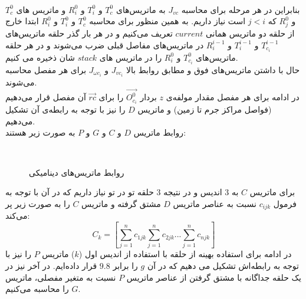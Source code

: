 \documentclass{article}
\begin{document}
\\
بنابراین در هر مرحله برای محاسبه $J_{vc}$ به ماتریس‌های $T_c^0$ و $T_i^0$ و $R_i^0$ و ماتریس های  $T_c^0$ و $R_j^0$ که $j<i$ است نیاز داریم. به همین منظور برای محاسبه  $T_c^0$ و $T_i^0$ و  $R_i^0$ ابتدا خارج از حلقه دو ماتریس همانی $current$ تعریف می‌کنیم و در هر بار گذر حلقه ماتریس‌های  $T_{c_i}^{i-1}$ و $T_{i}^{i-1}$ و $R_{i}^{i-1}$ در ماتریس‌های مفاصل قبلی ضرب می‌شوند و در هر حلقه ماتریس‌های $T_{c_i}^0$ و $R_i^0$ را در ماتریس های $stack$ شان ذخیره می کنیم.
\\
حال با داشتن ماتریس‌های فوق و مطابق روابط بالا $J_{vc_i}$ و $J_{\omega c_i}$ برای هر مفصل محاسبه می‌شوند.
\\
در ادامه برای هر مفصل مقدار مولفه‌ی $z$ بردار $\overrightarrow{O_{c_i}^0}$ را برای $\overrightarrow{rc}$ آن مفصل قرار می‌دهیم (فواصل مراکز جرم تا زمین) و ماتریس $D$ را نیز با توجه به رابطه‌ی آن تشکیل می‌دهیم.
\\
روابط ماتریس $D$ و $C$ و $G$ و $P$ به صورت زیر هستند:
\begin{figure}[H]%
    \centering
    \qquad
    \qquad
    \\
    \caption{روابط ماتریس‌های دینامیکی\label{fig:formula5}}
\end{figure}
\noindent
برای ماتریس $C$ به 3 اندیس و در نتیجه 3 حلقه تو در تو نیاز داریم که در آن با توجه به فرمول $c_{ijk}$ نسبت به عناصر ماتریس $D$ مشتق گرفته و ماتریس $C$ را به صورت زیر پر می‌کند:
\begin{equation}
C_k = [\sum_{j=1}^{n} c_{1jk} \sum_{j=1}^{n} c_{2jk} ... \sum_{j=1}^{n} c_{njk}]
\end{equation}
در ادامه برای استفاده بهینه از حلقه با استفاده از اندیس اول ($k$) ماتریس $P$ را نیز با توجه به رابطه‌اش تشکیل می دهیم که در آن $g$ را برابر $9.8$ قرار داده‌ایم.
در آخر نیز در یک حلقه جداگانه با مشتق گرفتن از عناصر ماتریس $P$ نسبت به متغیر مفصلی، ماتریس $G$ را محاسبه می‌کنیم.
\end{document}
